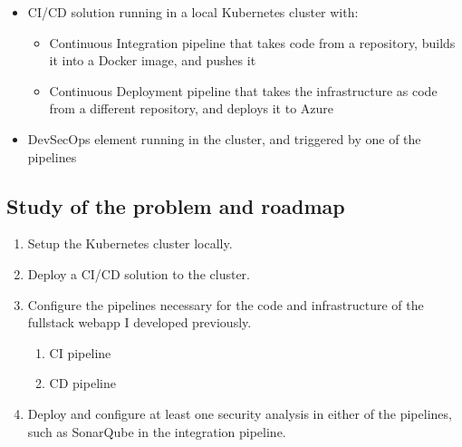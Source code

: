 \documentclass[11pt]{article}
\begin{document}
\begin{flushleft}
\begin{itemize}
        \item CI/CD solution running in a local Kubernetes cluster with:
            \begin{itemize}
                \itemsep0em 
                \item[\ding{118}] Continuous Integration pipeline that takes code from a repository, builds it into a Docker image, and pushes it
                
                \item[\ding{118}] Continuous Deployment pipeline that takes the infrastructure as code from a different repository, and deploys it to Azure
            \end{itemize}
    
        \item DevSecOps element running in the cluster, and triggered by one of the pipelines
    \end{itemize}
    
    
    \bigskip
    \bigskip
    \subsection{Study of the problem and roadmap}
        \begin{enumerate}
            \itemsep0em 
            \item Setup the Kubernetes cluster locally.
            
            \item Deploy a CI/CD solution to the cluster.
            
            \item Configure the pipelines necessary for the code and infrastructure of the fullstack webapp I developed previously.
                \begin{enumerate}
                    \itemsep0em 
                    \item CI pipeline
                    \item CD pipeline
                \end{enumerate}
            
            \item Deploy and configure at least one security analysis in either of the pipelines, such as SonarQube in the integration pipeline.
        
        \end{enumerate}










\end{flushleft}
\end{document}
